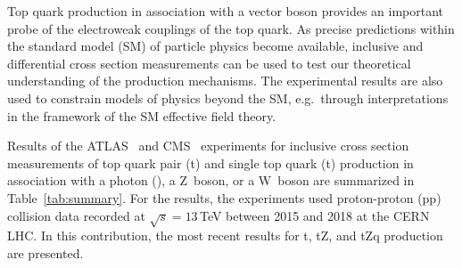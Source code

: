 \documentclass[12pt]{article}
\newcommand{\mybar}[1]{\smash{$\bar{\text{#1}}$}}
\newcommand{\tbar}{\mybar{t}}
\newcommand{\ttbar}{t\tbar}
\newcommand{\mygamma}{\textgamma\xspace}
\newcommand{\TeV}{\,TeV\xspace}
\newcommand{\sqrts}[1][13]{$\sqrt{s}=#1$\TeV}
\begin{document}
Top quark production in association with a vector boson provides an important probe of the electroweak couplings of the top quark.
As precise predictions within the standard model (SM) of particle physics become available, inclusive and differential cross section measurements can be used to test our theoretical understanding of the production mechanisms.
The experimental results are also used to constrain models of physics beyond the SM, e.g.\ through interpretations in the framework of the SM effective field theory.

Results of the ATLAS~\cite{ATLAS-Experiment} and CMS~\cite{CMS-Experiment} experiments for inclusive cross section measurements of top quark pair (\ttbar) and single top quark (t) production in association with a photon (\mygamma), a Z~boson, or a W~boson are summarized in Table~\ref{tab:summary}.
For the results, the experiments used proton-proton (pp) collision data recorded at \sqrts between 2015 and 2018 at the CERN LHC.
In this contribution, the most recent results for \ttbar\mygamma, \ttbar Z, and tZq production are presented.
\end{document}
